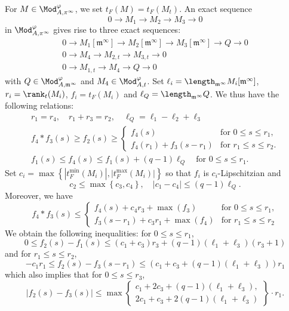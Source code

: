 \subsubsection{}\label{subsec:ExactSeqInModpi}

For $M\in\Mod_{A,\pi^{\infty}}^{\varphi}$, we set $t_{F}(M)=t_{F}(M_{t})$. An exact sequence
\[
0\rightarrow M_{1}\rightarrow M_{2}\rightarrow M_{3}\rightarrow0
\]
in $\Mod_{A,\pi^{\infty}}^{\varphi}$ gives rise to three exact sequences:
\begin{gather*}
0\rightarrow M_{1}[\mathfrak{m}^{\infty}]\rightarrow M_{2}[\mathfrak{m}^{\infty}]\rightarrow M_{3}[\mathfrak{m}^{\infty}]\rightarrow Q\rightarrow0
\\
0\rightarrow M_{4}\rightarrow M_{2,t}\rightarrow M_{3,t}\rightarrow0
\\
0\rightarrow M_{1,t}\rightarrow M_{4}\rightarrow Q\rightarrow0
\end{gather*}
with $Q\in\Mod_{A,\mathfrak{m}^{\infty}}^{\varphi}$ and $M_{4}\in\Mod_{A,t}^{\varphi}$. Set $\ell_{i}=\length_{\mathfrak{m}^{\infty}}M_{i}[\mathfrak{m}^{\infty}]$, $r_{i}=\rank_{t}(M_{i})$, $f_{i}=t_{F}(M_{i})$ and $\ell_{Q}=\length_{\mathfrak{m}^{\infty}}Q$. We thus have the following relations:
\begin{gather*}
r_{1}=r_{4},\quad r_{1}+r_{3}=r_{2},\quad\ell_{Q}=\ell_{1}-\ell_{2}+\ell_{3}
\\
f_{4}\ast f_{3}(s)\geq f_{2}(s)\geq
\begin{cases}
f_{4}(s) & \text{for }0\leq s\leq r_{1},\\
f_{4}(r_{1})+f_{3}(s-r_{1}) & \text{for }r_{1}\leq s\leq r_{2}.
\end{cases}
\\
f_{1}(s)\leq f_{4}(s)\leq f_{1}(s)+(q-1)\ell_{Q}\quad\text{for }0\leq s\leq r_{1}.
\end{gather*}
Set $c_{i}=\max\left\{
\left|t_{F}^{\min}(M_{i})\right|,\left|t_{F}^{\max}(M_{i})\right|\right\} $ so that $f_{i}$ is $c_{i}$-Lipschitzian and
\[
c_{2}\leq\max\left\{ c_{3},c_{4}\right\},\quad\left|c_{1}-c_{4}\right|\leq(q-1)\ell_{Q}.
\]
Moreover, we have
\[
f_{4}\ast f_{3}(s)\leq
\begin{cases}
f_{4}(s)+c_{4}r_{3}+\max(f_{3}) & \text{for }0\leq s\leq r_{1},\\
f_{3}(s-r_{1})+c_{3}r_{1}+\max(f_{4}) & \text{for }r_{1}\leq s\leq r_{2}
\end{cases}
\]
We obtain the following inequalities: for $0\leq s\leq r_{1}$,
\[
0\le f_{2}(s)-f_{1}(s)\leq\left(c_{1}+c_{3}\right)r_{3}+(q-1)(\ell_{1}+\ell_{3})(r_{3}+1)
\]
and for $r_{1}\leq s\leq r_{2}$,
\[
-c_{1}r_{1}\leq f_{2}(s)-f_{3}(s-r_{1})\leq\left(c_{1}+c_{3}+(q-1)(\ell_{1}+\ell_{3})\right)r_{1}
\]
which also implies that for $0\leq s\leq r_{3}$,
\[
\left|f_{2}(s)-f_{3}(s)\right|\leq\max\left\{\!
\begin{array}{c}
c_{1}+2c_{3}+(q-1)(\ell_{1}+\ell_{3}),\\
2c_{1}+c_{3}+2(q-1)(\ell_{1}+\ell_{3})
\end{array}\!\right\} \cdot r_{1}.
\]

